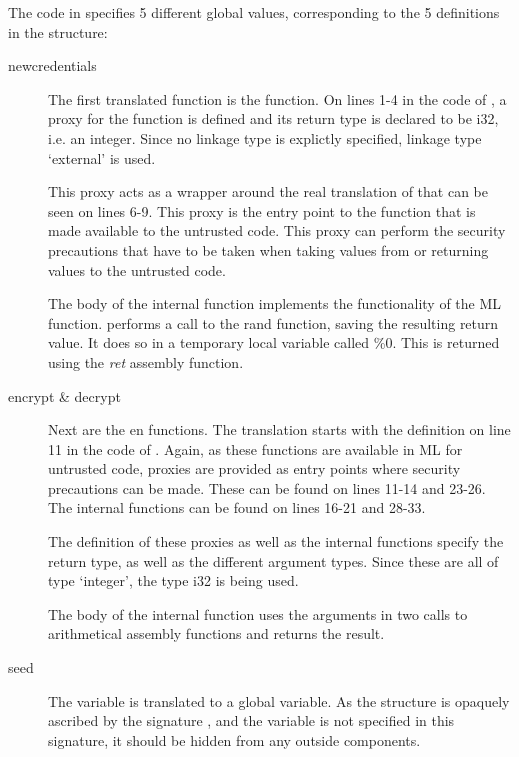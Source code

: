 The code in  specifies 5 different global values, corresponding to the 5 definitions in the  structure:
\begin{description}
\item[newcredentials] The first translated function is the  function.
On lines 1-4 in the code of , a proxy for the function is defined and its return type is declared to be i32, i.e. an integer. Since no linkage type is explictly specified, linkage type `external'  is used.

This proxy acts as a wrapper around the real translation of  that can be seen on lines 6-9. This proxy is the entry point to the function that is made available to the untrusted code. This proxy can perform the security precautions that have to be taken when taking values from or returning values to the untrusted code.

The body of the internal function  implements the functionality of the ML  function.
 performs a call to the rand function, saving the resulting return value. It does so in a temporary local variable called \%0. This is returned using the \emph{ret} assembly function.

\item[encrypt \& decrypt] Next are the  en  functions. The translation starts with the definition on line 11 in the code of . Again, as these functions are available in ML for untrusted code, proxies are provided as entry points where security precautions can be made. These can be found on lines 11-14 and 23-26. The internal functions can be found on lines 16-21 and 28-33.

The definition of these proxies as well as the internal functions specify the return type, as well as the different argument types. Since these are all of type `integer', the type i32 is being used.

The body of the internal function uses the arguments in two calls to arithmetical assembly functions and returns the result.
\item[seed] The variable  is translated to a global variable. As the structure is opaquely ascribed by the signature , and the variable  is not specified in this signature, it should be hidden from any outside components.


\end{description}
